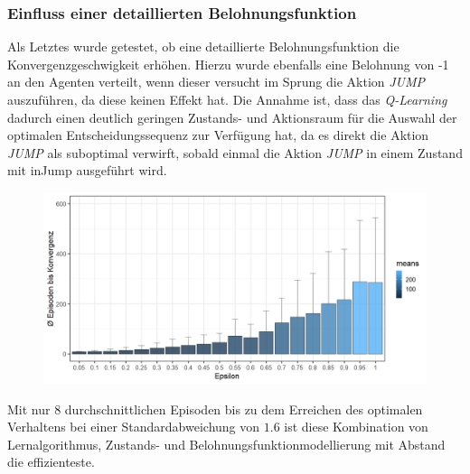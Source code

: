 \subsubsection*{Einfluss einer detaillierten Belohnungsfunktion}
Als Letztes wurde getestet, ob eine detaillierte Belohnungsfunktion die Konvergenzgeschwigkeit erhöhen. Hierzu wurde ebenfalls eine Belohnung von -1 an den Agenten verteilt, wenn dieser versucht im Sprung die Aktion \textit{JUMP} auszuführen, da diese keinen Effekt hat. Die Annahme ist, dass das \textit{Q-Learning} dadurch einen deutlich geringen Zustands- und Aktionsraum für die Auswahl der optimalen Entscheidungssequenz zur Verfügung hat, da es direkt  die Aktion \textit{JUMP} als suboptimal verwirft, sobald einmal die Aktion \textit{JUMP} in einem Zustand mit \glqq inJump\grqq{} ausgeführt wird. 
\begin{figure}[H]
    \centering
    \includegraphics[width=\textwidth]{images/SimpleZ2B4QLearningA}
    \label{fig:test1}
\end{figure}
Mit nur 8 durchschnittlichen Episoden bis zu dem Erreichen des optimalen Verhaltens bei einer Standardabweichung von $1.6$ ist diese Kombination von Lernalgorithmus, Zustands- und Belohnungsfunktionmodellierung mit Abstand die effizienteste.

